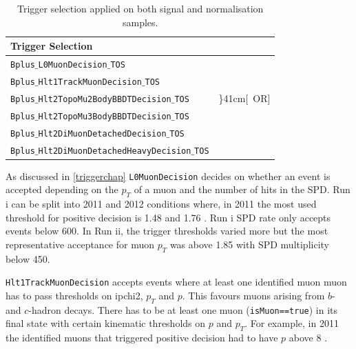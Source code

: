 \begin{table}[h!]
\begin{center}
	\begin{tabular}{ l l}%
Trigger Selection  \\ %
\hline
		\texttt{Bplus$\_$L0MuonDecision$\_$TOS} \\ %
\hline
		\texttt{Bplus$\_$Hlt1TrackMuonDecision$\_$TOS} \\%
\hline
		\texttt{Bplus$\_$Hlt2TopoMu2BodyBBDTDecision$\_$TOS} & \rdelim\}{4}{1cm}[\ OR]\\ %
		\texttt{Bplus$\_$Hlt2TopoMu3BodyBBDTDecision$\_$TOS} \\ %
		\texttt{Bplus$\_$Hlt2DiMuonDetachedDecision$\_$TOS} \\ %
		\texttt{Bplus$\_$Hlt2DiMuonDetachedHeavyDecision$\_$TOS} \\ %
\hline
\end{tabular}
\end{center}
	\caption{Trigger selection applied on both signal and normalisation samples.}
	\label{tab:triggersel}
\end{table}

As discussed in \autoref{triggerchap} \texttt{L0MuonDecision} decides on whether an event is accepted depending on the $p_{T}$ of a muon and the number of hits in the \gls{SPD}. Run \Rn{1} can be split into 2011 and 2012 conditions where, in 2011 the most used threshold for positive decision is 1.48 \gevc \cite{Aaij:2012me} and 1.76 \gevc \cite{Albrecht:2013fba}. Run \Rn{1} \gls{SPD} rate only accepts events below 600. In Run \Rn{2}, the trigger thresholds varied more but the most representative acceptance for muon $p_{T}$ was above 1.85 \gevc with \gls{SPD} multiplicity below 450.

\texttt{Hlt1TrackMuonDecision} accepts events where at least one identified muon muon has to pass thresholds on \gls{ipchi2}, $p_{T}$ and $p$. This favours muons arising from $b$- and $c$-hadron decays. There has to be at least one muon (\texttt{isMuon==true}) in its final state with certain kinematic thresholds on $p$ and $p_{T}$. For example, in 2011 the identified muons that triggered positive decision had to have $p$ above 8 \gevc \cite{Aaij:2012me}.

